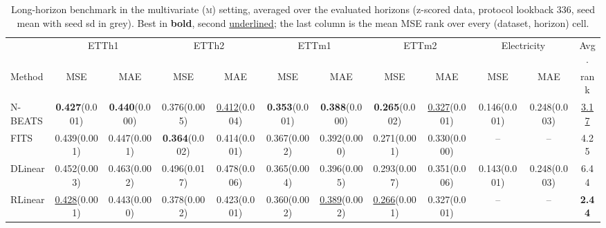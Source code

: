 \begin{table}[!t]
\centering
\caption{Long-horizon benchmark in the multivariate (\textsc{m}) setting, averaged over the evaluated horizons (z-scored data, protocol lookback 336, seed mean with seed sd in grey). Best in \textbf{bold}, second \underline{underlined}; the last column is the mean MSE rank over every (dataset, horizon) cell.}
\label{tab:bench-v2}
\setlength{\tabcolsep}{3pt}\footnotesize
\begin{adjustbox}{max width=\linewidth}
\begin{tabular}{lccccccccccc}
\toprule
 & \multicolumn{2}{c}{ETTh1} & \multicolumn{2}{c}{ETTh2} & \multicolumn{2}{c}{ETTm1} & \multicolumn{2}{c}{ETTm2} & \multicolumn{2}{c}{Electricity} & Avg. \\
\cmidrule(lr){2-3} \cmidrule(lr){4-5} \cmidrule(lr){6-7} \cmidrule(lr){8-9} \cmidrule(lr){10-11}
Method & MSE & MAE & MSE & MAE & MSE & MAE & MSE & MAE & MSE & MAE & rank \\
\midrule
N-BEATS & \textbf{0.427}{\scriptsize\color{gray}(0.001)} & \textbf{0.440}{\scriptsize\color{gray}(0.000)} & 0.376{\scriptsize\color{gray}(0.005)} & \underline{0.412}{\scriptsize\color{gray}(0.004)} & \textbf{0.353}{\scriptsize\color{gray}(0.001)} & \textbf{0.388}{\scriptsize\color{gray}(0.000)} & \textbf{0.265}{\scriptsize\color{gray}(0.002)} & \underline{0.327}{\scriptsize\color{gray}(0.001)} & 0.146{\scriptsize\color{gray}(0.001)} & 0.248{\scriptsize\color{gray}(0.003)} & \underline{3.17} \\
FITS & 0.439{\scriptsize\color{gray}(0.001)} & 0.447{\scriptsize\color{gray}(0.001)} & \textbf{0.364}{\scriptsize\color{gray}(0.002)} & 0.414{\scriptsize\color{gray}(0.001)} & 0.367{\scriptsize\color{gray}(0.002)} & 0.392{\scriptsize\color{gray}(0.000)} & 0.271{\scriptsize\color{gray}(0.001)} & 0.330{\scriptsize\color{gray}(0.000)} & -- & -- & 4.25 \\
DLinear & 0.452{\scriptsize\color{gray}(0.003)} & 0.463{\scriptsize\color{gray}(0.002)} & 0.496{\scriptsize\color{gray}(0.017)} & 0.478{\scriptsize\color{gray}(0.006)} & 0.365{\scriptsize\color{gray}(0.004)} & 0.396{\scriptsize\color{gray}(0.005)} & 0.293{\scriptsize\color{gray}(0.007)} & 0.351{\scriptsize\color{gray}(0.006)} & 0.143{\scriptsize\color{gray}(0.001)} & 0.248{\scriptsize\color{gray}(0.003)} & 6.44 \\
RLinear & \underline{0.428}{\scriptsize\color{gray}(0.001)} & 0.443{\scriptsize\color{gray}(0.000)} & 0.378{\scriptsize\color{gray}(0.002)} & 0.423{\scriptsize\color{gray}(0.001)} & 0.360{\scriptsize\color{gray}(0.002)} & \underline{0.389}{\scriptsize\color{gray}(0.002)} & \underline{0.266}{\scriptsize\color{gray}(0.001)} & 0.327{\scriptsize\color{gray}(0.001)} & -- & -- & \textbf{2.44} \\

\end{tabular}
\end{adjustbox}
\end{table}
